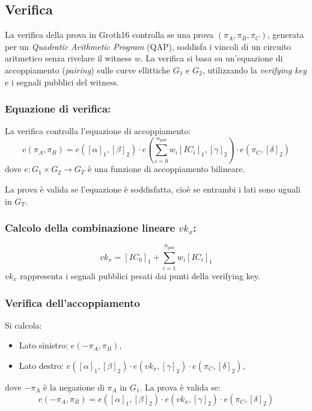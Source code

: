\subsection{Verifica}
La verifica della prova in Groth16 controlla se una prova \((\pi_A, \pi_B, \pi_C)\), generata per un \emph{Quadratic Arithmetic Program} (QAP), soddisfa i vincoli di un circuito aritmetico senza rivelare il witness \(w\). La verifica si basa su un'equazione di accoppiamento (\emph{pairing}) sulle curve ellittiche \(G_1\) e \(G_2\), utilizzando la \emph{verifying key} e i segnali pubblici del witness.

\subsubsection{Equazione di verifica:}
La verifica controlla l'equazione di accoppiamento:
\begin{equation}
    e(\pi_A, \pi_B) = e([\alpha]_1, [\beta]_2) \cdot e\left(\sum_{i=0}^{n_{pub}} w_i [IC_i]_1, [\gamma]_2\right) \cdot e(\pi_C, [\delta]_2)
\end{equation}
dove \(e: G_1 \times G_2 \to G_T\) è una funzione di accoppiamento bilineare. 

La prova è valida se l'equazione è soddisfatta, cioè se entrambi i lati sono uguali in \(G_T\).

\subsubsection{Calcolo della combinazione lineare \(vk_x\):}
\begin{equation}
    vk_x = [IC_0]_1 + \sum_{i=1}^{n_{pub}} w_i [IC_i]_1
\end{equation}
\(vk_x\) rappresenta i segnali pubblici pesati dai punti della verifying key.

\subsubsection*{Verifica dell'accoppiamento}
Si calcola:
\begin{itemize}
    \item Lato sinistro: \(e(-\pi_A, \pi_B)\),
    \item Lato destro: \(e([\alpha]_1, [\beta]_2) \cdot e(vk_x, [\gamma]_2) \cdot e(\pi_C, [\delta]_2)\),
\end{itemize}
dove \(-\pi_A\) è la negazione di \(\pi_A\) in \(G_1\). La prova è valida se:
\begin{equation}
    e(-\pi_A, \pi_B) = e([\alpha]_1, [\beta]_2) \cdot e(vk_x, [\gamma]_2) \cdot e(\pi_C, [\delta]_2)
\end{equation}

